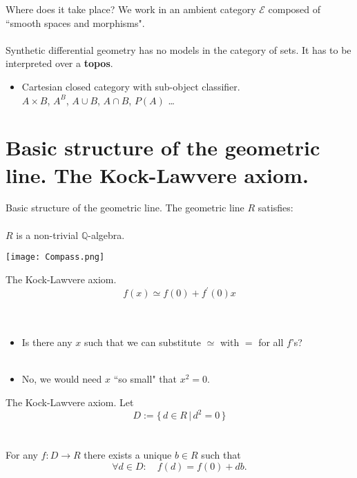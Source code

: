 \documentclass[handout, 11pt]{beamer}
\newenvironment{axiom}[1]
{\renewcommand\theinneraxiom{#1}\inneraxiom}
{\endinneraxiom}
\begin{document}
\begin{frame}{Where does it take place?}
	We work in an ambient category $\mathcal{E}$ composed of ``smooth spaces and morphisms". \\~\\
	Synthetic differential geometry has no models in the category of sets. It has to be interpreted
	over a \textbf{topos}.
	\begin{itemize}
		\item Cartesian closed category with sub-object classifier. \\
		$A\times B$, $A^B$, $A\cup B$, $A\cap B$, $P(A)$ \dots
		
	\end{itemize}
\end{frame}

\section{Basic structure of the geometric line. The Kock-Lawvere axiom.}
\begin{frame}{Basic structure of the geometric line.}
	The geometric line $R$ satisfies:  \\~\\
	\begin{axiom}{0} $R$ is a non-trivial $\mathbb{Q}$-algebra.
	\end{axiom}
	\begin{center}
		\texttt{[image: Compass.png]}
	\end{center}
\end{frame}

\begin{frame}{The Kock-Lawvere axiom.}
\[ f(x) \simeq f(0) + f^\prime(0)x \]
\\~\\
\begin{itemize}
	\item Is there any $x$ such that we can substitute $\simeq$ with $=$ for all $f$'s? 
	\\~\\
	\pause
	\item No, we would need $x$ ``so small" that $x^2=0$.  
	
\end{itemize}
\end{frame}

\begin{frame}{The Kock-Lawvere axiom.}
Let 
\[
D:=\{ \, d\in R  \, | \, d^2=0 \,\}\] \\~\\

\begin{axiom}{1}[Kock-Lawvere axiom]
	For any $f:D\rightarrow R$ there exists a unique $b\in R$ such that
	\[\forall d\in D: \quad f(d)= f(0) + db. \]
\end{axiom}
\end{frame}
\end{document}
